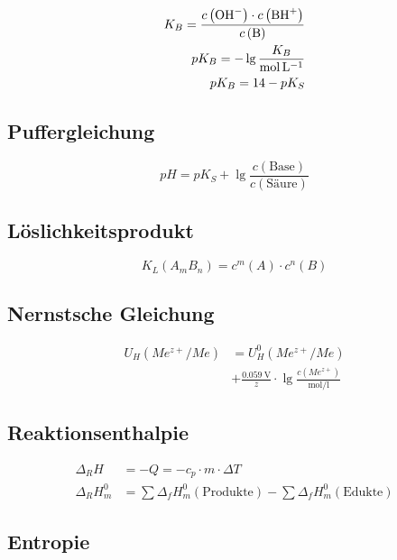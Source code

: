 \begin{align}
K_B = \frac{c\left(\ce{OH-}\right) \cdot c\left(\ce{BH+}\right)}{c\left(\ce{B}\right)}\\
pK_B = -\lg\frac{K_B}{\si{\mol\per\litre}}\\
pK_B = 14 - pK_S
\end{align}

\subsection{Puffergleichung}

\begin{equation}
pH = pK_S + \lg\frac{c\left(\text{Base}\right)}{c\left(\text{Säure}\right)}
\end{equation}

\subsection{Löslichkeitsprodukt}

\begin{equation}
K_L\left(A_mB_n\right) = c^m\left(A\right) \cdot c^n\left(B\right)
\end{equation}

\subsection{Nernstsche Gleichung}

\begin{equation}
\begin{split}
U_H\left(Me^{z+} / Me\right) &= U_H^0\left(Me^{z+} / Me\right) \\
 &+ \frac{\SI{0.059}{\volt}}{z} \cdot \lg\frac{c\left(Me^{z+}\right)}{\si{\mol\per\litre}}
\end{split}
\end{equation}

\subsection{Reaktionsenthalpie}

\begin{align}
\Delta_R H &= - Q = -c_p \cdot m \cdot \Delta T\\
\Delta_R H_m^0 &= \sum\Delta_fH_m^0\left(\text{Produkte}\right) - \sum\Delta_fH_m^0\left(\text{Edukte}\right)
\end{align}

\subsection{Entropie}

